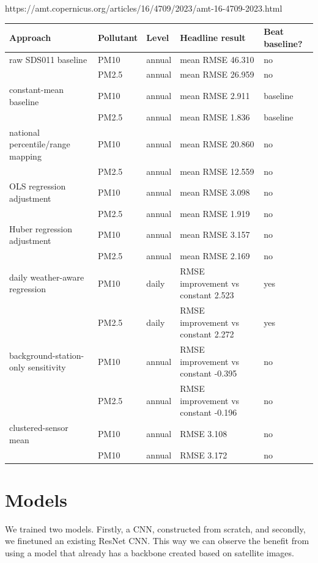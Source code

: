 \documentclass[english, a4paper, numbers=noenddot]{article}
\begin{document}
https://amt.copernicus.org/articles/16/4709/2023/amt-16-4709-2023.html 


\begin{tabular}{lllll}
\hline
\caption{Table 1: Results from Calibration attempts}
\label{tab:calibration_results}
 \textbf{Approach}  & \textbf{Pollutant}  &\textbf{Level}  &\textbf{Headline result}  &\textbf{Beat baseline?}  \\
 \hline
  raw SDS011 baseline  &PM10  &annual  &mean RMSE 46.310  &no  \\
   &PM2.5  &annual  &mean RMSE 26.959  &no  \\
\hline
constant-mean baseline  &PM10  &annual  &mean RMSE 2.911  &baseline  \\
  &PM2.5  &annual  &mean RMSE 1.836  &baseline  \\
 \hline
 national percentile/range mapping  &PM10  &annual  &mean RMSE 20.860  &no  \\
  &PM2.5  &annual  &mean RMSE 12.559  &no  \\
\hline
 OLS regression adjustment  &PM10  &annual  &mean RMSE 3.098  &no  \\
  &PM2.5  &annual  &mean RMSE 1.919  &no  \\
\hline
 Huber regression adjustment  &PM10  &annual  &mean RMSE 3.157  &no  \\
   &PM2.5  &annual  &mean RMSE 2.169  &no  \\
\hline
 daily weather-aware regression  &PM10  &daily  &RMSE improvement vs constant 2.523  &yes  \\
  &PM2.5  &daily  &RMSE improvement vs constant 2.272  &yes  \\
\hline
 background-station-only sensitivity  &PM10  &annual  &RMSE improvement vs constant -0.395  &no  \\
   &PM2.5  &annual  &RMSE improvement vs constant -0.196  &no  \\
\hline
 clustered-sensor mean  &PM10  &annual  &RMSE 3.108  &no  \\
  &PM10  &annual  &RMSE 3.172  &no \\
\hline
\end{tabular}






\section{Models}
We trained two models. Firstly, a CNN, constructed from scratch, and secondly, we finetuned an existing ResNet CNN. This way we can observe the benefit from using a model that already has a backbone created based on satellite images. 
\end{document}
